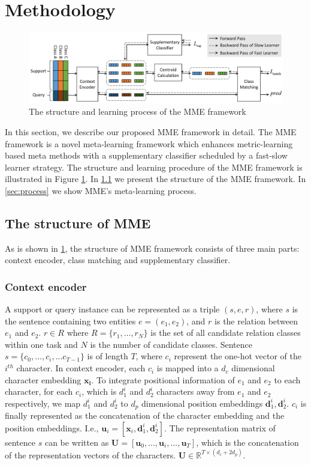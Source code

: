 \section{Methodology}
\begin{figure}[ht]
    \centering
    \includegraphics[width=16cm]{model.png}
    \caption{The structure and learning process of the MME framework}
    \label{fig:model}
\end{figure}
In this section, we describe our proposed MME framework in detail.
The MME framework is a novel meta-learning framework which enhances metric-learning based meta methods with a supplementary classifier scheduled by a fast-slow learner strategy. The structure and learning procedure of the MME framework is illustrated in Figure \ref{fig:model}. In \ref{sec:structure} we present the structure of the MME framework. In \ref{sec:process} we show MME's meta-learning process.
\subsection{The structure of MME}
\label{sec:structure}
As is shown in \ref{fig:model}, the structure of MME framework consists of three main parts: context encoder, class matching and supplementary classifier.
\subsubsection{Context encoder}
A support or query instance can be represented as a triple $(s, e, r)$, where $s$ is the sentence containing two entities $e=(e_1,e_2)$, and $r$ is the relation between $e_1$ and $e_2$. $r \in R$ where $R=\{r_1,...,r_N\}$ is the set of all candidate relation classes within one task and $N$ is the number of candidate classes.
Sentence $s=\{c_0,..., c_i, ... c_{T-1}\}$ is of length $T$, where $c_i$ represent the one-hot vector of the $i^{th}$ character.
In context encoder, each $c_i$ is mapped into a $d_c$ dimensional character embedding $\bm{x_i}$.
To integrate positional information of $e_1$ and $e_2$ to each character, for each $c_i$, which is $d_1^i$ and $d_2^i$ characters away from $e_1$ and $e_2$ respectively, we map $d_1^i$ and $d_2^i$ to $d_p$ dimensional position embeddings $\mathbf{d}_1^i,\mathbf{d}_2^i$.
$c_i$ is finally represented as the concatenation of the character embedding and the position embeddings. I.e., $\mathbf{u}_i=[\mathbf{x}_i,\mathbf{d}_1^i,\mathbf{d}_2^i]$.
The representation matrix of sentence $s$ can be written as $\mathbf{U}=[\mathbf{u}_0,..., \mathbf{u}_i, ... ,\mathbf{u}_T]$, which is the concatenation of the representation vectors of the characters. $\mathbf{U} \in \mathbb{R}^{T\times (d_c + 2  d_p)}$.

